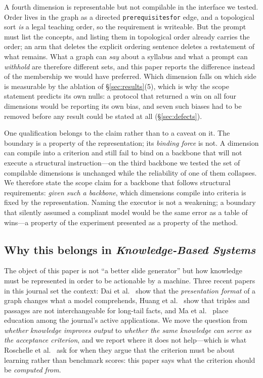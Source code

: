 \documentclass[review,12pt]{elsarticle}
\renewcommand{\_}{\kgunderscore\allowbreak}
\newcommand{\id}[1]{\texttt{#1}}
\begin{document}
A fourth dimension is representable but not compilable in the interface we tested.
Order lives in the graph as a directed \id{prerequisites\_for} edge, and a
topological sort \emph{is} a legal teaching order, so the requirement is
writeable. But the prompt must list the concepts, and listing them in topological
order already carries the order; an arm that deletes the explicit ordering sentence
deletes a restatement of what remains. What a graph can \emph{say} about a
syllabus and what a prompt can \emph{withhold} are therefore different sets, and
this paper reports the difference instead of the membership we would have
preferred. Which dimension falls on which side is measurable by the ablation of
\S\ref{sec:results}(5), which is why the scope statement predicts its own nulls:
a protocol that returned a win on all four dimensions would be reporting its own
bias, and seven such biases had to be removed before any result could be stated at
all (\S\ref{sec:defects}).

One qualification belongs to the claim rather than to a caveat on it. The boundary
is a property of the representation; its \emph{binding force} is not. A dimension
can compile into a criterion and still fail to bind on a backbone that will not
execute a structural instruction---on the third backbone we tested the set of
compilable dimensions is unchanged while the reliability of one of them collapses.
We therefore state the scope claim for a backbone that follows structural
requirements: \emph{given such a backbone}, which dimensions compile into criteria
is fixed by the representation. Naming the executor is not a weakening; a boundary
that silently assumed a compliant model would be the same error as a table of
wins---a property of the experiment presented as a property of the method.

\subsection{Why this belongs in \emph{Knowledge-Based Systems}}

The object of this paper is not ``a better slide generator'' but how
knowledge must be represented in order to be actionable by a machine. Three recent
papers in this journal set the context: Dai et al.~\cite{dai2025kg} show that the
\emph{presentation format} of a graph changes what a model comprehends, Huang et
al.~\cite{huang2025longtail} show that triples and passages are not interchangeable
for long-tail facts, and Ma et al.~\cite{ma2026ledlcm} place education among the
journal's active applications. We move the question from \emph{whether knowledge
improves output} to \emph{whether the same knowledge can serve as the acceptance
criterion}, and we report where it does not help---which is what
Roschelle et al.~\cite{roschelle2025beyond} ask for when they argue that the
criterion must be about learning rather than benchmark scores: this paper says what
the criterion should be \emph{computed from}.
\end{document}
